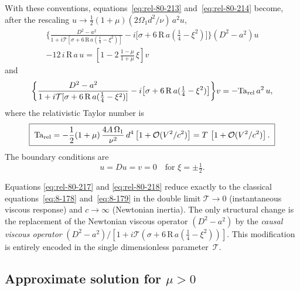 With these conventions, equations~\eqref{eq:rel-80-213}
and~\eqref{eq:rel-80-214} become, after the rescaling
$u\to\tfrac{1}{2}(1+\mu)(2\Omega_{1}d^{2}/\nu)\,a^{2}u$,
\begin{multline}
\label{eq:rel-80-217}
\biggl\{\frac{D^{2}-a^{2}}{1+i\mathcal{T}[\sigma+6\,\mathrm{R}\,a
  (\tfrac{1}{4}-\xi^{2})]}
  - i\bigl[\sigma + 6\,\mathrm{R}\,a(\tfrac{1}{4}-\xi^{2})\bigr]
  \biggr\}(D^{2}-a^{2})u \\
  - 12\,i\,\mathrm{R}\,a\,u
  = \left[1 - 2\,\frac{1-\mu}{1+\mu}\,\xi\right]v
\end{multline}
and
\begin{equation}
\label{eq:rel-80-218}
\biggl\{\frac{D^{2}-a^{2}}{1+i\mathcal{T}[\sigma+6\,\mathrm{R}\,a
  (\tfrac{1}{4}-\xi^{2})]}
  - i\bigl[\sigma + 6\,\mathrm{R}\,a(\tfrac{1}{4}-\xi^{2})\bigr]
  \biggr\}v
= -\mathrm{Ta}_{\mathrm{rel}}\,a^{2}\,u,
\end{equation}
where the relativistic Taylor number is
\begin{equation}
\label{eq:rel-80-219}
\boxed{\;
\mathrm{Ta}_{\mathrm{rel}} = -\frac{1}{2}(1+\mu)\,\frac{4A\,\Omega_{1}}{\nu^{2}}\,d^{4}
  \left[1 + \mathcal{O}(V^{2}/c^{2})\right]
  = T\,\left[1 + \mathcal{O}(V^{2}/c^{2})\right].
\;}
\end{equation}
The boundary conditions are
\begin{equation}
\label{eq:rel-80-220}
u = Du = v = 0 \quad\text{for } \xi = \pm\tfrac{1}{2}.
\end{equation}

\begin{relcorrection}
Equations \eqref{eq:rel-80-217} and \eqref{eq:rel-80-218} reduce
exactly to the classical equations~\eqref{eq:8-178}
and~\eqref{eq:8-179} in the double limit $\mathcal{T}\to 0$
(instantaneous viscous response) and $c\to\infty$ (Newtonian inertia).
The only structural change is the replacement of the Newtonian viscous
operator $(D^{2}-a^{2})$ by the \emph{causal viscous operator}
$(D^{2}-a^{2})/[1+i\mathcal{T}(\sigma+6\,\mathrm{R}\,a
(\frac{1}{4}-\xi^{2}))]$.  This modification is entirely encoded in
the single dimensionless parameter~$\mathcal{T}$.
\end{relcorrection}

\subsection{Approximate solution for $\mu>0$}\label{sec:rel-80-approx}

